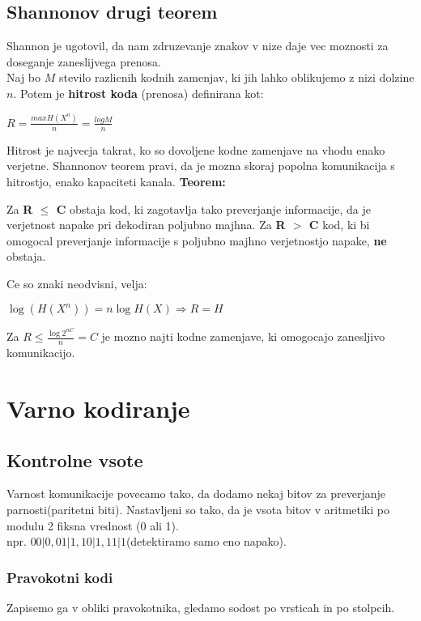 \documentclass{article}
\begin{document}
\begin{multicols}{4}
\subsection{Shannonov drugi teorem}
Shannon je ugotovil, da nam zdruzevanje znakov v nize daje vec moznosti za doseganje zaneslijvega prenosa.\\
Naj bo $M$ stevilo razlicnih kodnih zamenjav, ki jih lahko oblikujemo z nizi dolzine $n$. Potem je \textbf{hitrost koda}
(prenosa)  definirana kot:
\begin{center}
    \begin{math}
        R = \frac{max H(X^n)}{n} = \frac{log M}{n}
    \end{math}
\end{center}
Hitrost je najvecja takrat, ko so dovoljene kodne zamenjave na vhodu enako verjetne. Shannonov teorem pravi, da je mozna
skoraj popolna komunikacija s hitrostjo, enako kapaciteti kanala.
\textbf{Teorem:}\\
\begin{center}
    Za \textbf{R $\leq$ C} obstaja kod, ki zagotavlja tako preverjanje informacije, da je verjetnost napake pri
    dekodiran  poljubno majhna. Za \textbf{R $>$ C} kod, ki bi omogocal preverjanje informacije s poljubno majhno
    verjetnostjo napake, \textbf{ne} obstaja.
\end{center}
Ce so znaki neodvisni, velja:
\begin{center}
    \begin{math}
        \log(H(X^n)) = n \log H(X) \Rightarrow R = H
    \end{math}
\end{center}
Za $R \leq \frac{\log 2^{nC}}{n} = C$ je mozno najti kodne zamenjave, ki omogocajo zanesljivo komunikacijo.

\section{Varno kodiranje}

\subsection{Kontrolne vsote}
Varnost komunikacije povecamo tako, da dodamo nekaj bitov za preverjanje parnosti(paritetni biti).
Nastavljeni so tako, da je vsota bitov v aritmetiki po modulu 2 fiksna vrednost (0 ali 1).\\
npr. $00|0, 01|1, 10|1, 11|1$(detektiramo samo eno napako).

\subsubsection{Pravokotni kodi}
Zapisemo ga v obliki pravokotnika, gledamo sodost po vrsticah in po stolpcih.


\end{multicols}
\end{document}
